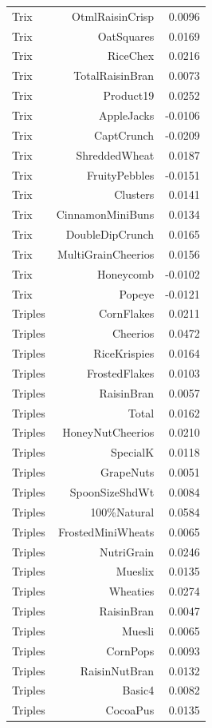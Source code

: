 \begin{longtable}{@{}lrr@{}}
Trix & OtmlRaisinCrisp & 0.0096 \\
Trix & OatSquares & 0.0169 \\
Trix & RiceChex & 0.0216 \\
Trix & TotalRaisinBran & 0.0073 \\
Trix & Product19 & 0.0252 \\
Trix & AppleJacks & -0.0106 \\
Trix & CaptCrunch & -0.0209 \\
Trix & ShreddedWheat & 0.0187 \\
Trix & FruityPebbles & -0.0151 \\
Trix & Clusters & 0.0141 \\
Trix & CinnamonMiniBuns & 0.0134 \\
Trix & DoubleDipCrunch & 0.0165 \\
Trix & MultiGrainCheerios & 0.0156 \\
Trix & Honeycomb & -0.0102 \\
Trix & Popeye & -0.0121 \\
Triples & CornFlakes & 0.0211 \\
Triples & Cheerios & 0.0472 \\
Triples & RiceKrispies & 0.0164 \\
Triples & FrostedFlakes & 0.0103 \\
Triples & RaisinBran & 0.0057 \\
Triples & Total & 0.0162 \\
Triples & HoneyNutCheerios & 0.0210 \\
Triples & SpecialK & 0.0118 \\
Triples & GrapeNuts & 0.0051 \\
Triples & SpoonSizeShdWt & 0.0084 \\
Triples & 100\%Natural & 0.0584 \\
Triples & FrostedMiniWheats & 0.0065 \\
Triples & NutriGrain & 0.0246 \\
Triples & Mueslix & 0.0135 \\
Triples & Wheaties & 0.0274 \\
Triples & RaisinBran & 0.0047 \\
Triples & Muesli & 0.0065 \\
Triples & CornPops & 0.0093 \\
Triples & RaisinNutBran & 0.0132 \\
Triples & Basic4 & 0.0082 \\
Triples & CocoaPus & 0.0135 \\

\end{longtable}

